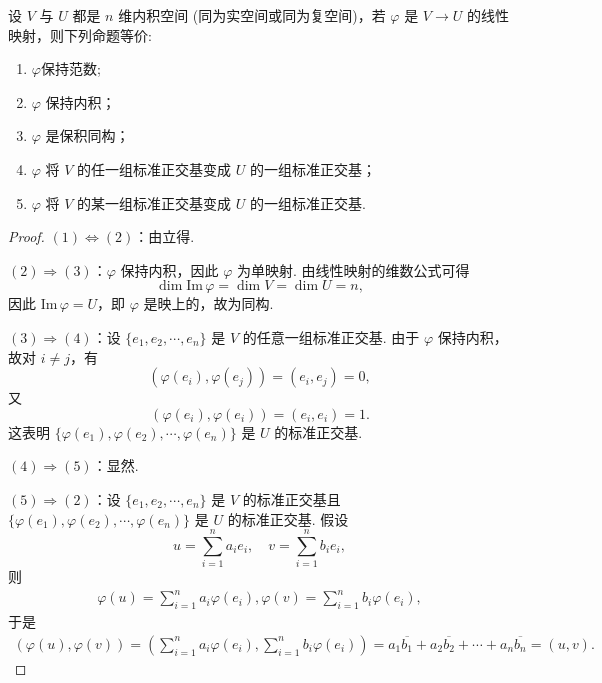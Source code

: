 \documentclass[../../main.tex]{subfiles}
\begin{document}
\begin{theorem}\label{theorem:保积同构的等价命题}
设 $V$ 与 $U$ 都是 $n$ 维内积空间 (同为实空间或同为复空间)，若 $\varphi$ 是 $V \to U$ 的线性映射，则下列命题等价:
\begin{enumerate}[(1)]
\item $\varphi$保持范数;

\item $\varphi$ 保持内积；

\item  $\varphi$ 是保积同构；

\item  $\varphi$ 将 $V$ 的任一组标准正交基变成 $U$ 的一组标准正交基；

\item $\varphi$ 将 $V$ 的某一组标准正交基变成 $U$ 的一组标准正交基.
\end{enumerate}
\end{theorem}
\begin{proof}
$(1) \Leftrightarrow  (2)$：由立得.

$(2) \Rightarrow (3)$：$\varphi$ 保持内积，因此 $\varphi$ 为单映射. 由线性映射的维数公式可得
\[
\dim \text{Im}\,\varphi = \dim V = \dim U = n,
\]
因此 $\text{Im}\,\varphi = U$，即 $\varphi$ 是映上的，故为同构.

$(3) \Rightarrow (4)$：设 $\{e_1,e_2,\cdots,e_n\}$ 是 $V$ 的任意一组标准正交基. 由于 $\varphi$ 保持内积，故对 $i \neq j$，有
\[
(\varphi(e_i),\varphi(e_j)) = (e_i,e_j) = 0,
\]
又
\[
(\varphi(e_i),\varphi(e_i)) = (e_i,e_i) = 1.
\]
这表明 $\{\varphi(e_1),\varphi(e_2),\cdots,\varphi(e_n)\}$ 是 $U$ 的标准正交基.

$(4) \Rightarrow (5)$：显然.

$(5) \Rightarrow (2)$：设 $\{e_1,e_2,\cdots,e_n\}$ 是 $V$ 的标准正交基且 $\{\varphi(e_1),\varphi(e_2),\cdots,\varphi(e_n)\}$ 是 $U$ 的标准正交基. 假设
\[
u = \sum_{i = 1}^{n}a_ie_i,\quad v = \sum_{i = 1}^{n}b_ie_i,
\]
则
\begin{align*}
\varphi (u)=\sum_{i=1}^n{a_i\varphi (e_i),\varphi (v)=\sum_{i=1}^n{b_i\varphi (e_i),}}
\end{align*}
于是
\begin{align*}
(\varphi (u),\varphi (v))=\left( \sum_{i=1}^n{a_i\varphi (e_i),\sum_{i=1}^n{b_i\varphi (e_i)}} \right) =a_1\overline{b_1}+a_2\overline{b_2}+\cdots +a_n\overline{b_n}=(u,v).
\end{align*}

\end{proof}
\end{document}
